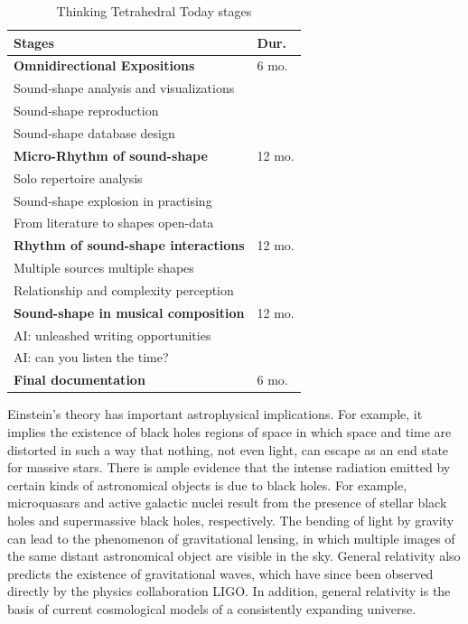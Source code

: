 \begin{table}[htp]
\begin{center}
\begin{tabular}{ll}
\textbf{Stages} & \textbf{Dur.} \\
\hline
\textbf{Omnidirectional Expositions} & 6 mo. \\
Sound-shape analysis and visualizations & \\
Sound-shape reproduction & \\
Sound-shape database design & \\
\hline
\textbf{Micro-Rhythm of sound-shape} & 12 mo. \\
Solo repertoire analysis & \\
Sound-shape explosion in practising & \\
From literature to shapes open-data & \\
\hline
\textbf{Rhythm of sound-shape interactions} & 12 mo. \\
Multiple sources multiple shapes & \\
Relationship and complexity perception & \\
\hline
\textbf{Sound-shape in musical composition} & 12 mo. \\
AI: unleashed writing opportunities & \\
AI: can you listen the time? & \\
\hline
\textbf{Final documentation} & 6 mo. \\
\end{tabular}
\label{timesheet}
\caption{Thinking Tetrahedral Today stages}
\end{center}
\end{table}%

Einstein's theory has important astrophysical implications. For example, it
implies the existence of black holes regions of space in which space and time
are distorted in such a way that nothing, not even light, can escape as an
end state for massive stars. There is ample evidence that the intense radiation
emitted by certain kinds of astronomical objects is due to black holes. For
example, microquasars and active galactic nuclei result from the presence of
stellar black holes and supermassive black holes, respectively. The bending of
light by gravity can lead to the phenomenon of gravitational lensing, in which
multiple images of the same distant astronomical object are visible in the sky.
General relativity also predicts the existence of gravitational waves, which
have since been observed directly by the physics collaboration LIGO. In addition,
general relativity is the basis of current cosmological models of a consistently
expanding universe. \cite{gerzon_70b}


